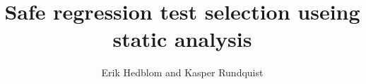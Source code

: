 \documentclass[11pt]{article}
\begin{document}
\title{Safe regression test selection useing static analysis}
\author{Erik Hedblom and Kasper Rundquist}
\maketitle

\cite{DBLP:conf/pppj/OqvistHM16} \cite{DBLP:conf/sigsoft/LegunsenHSLZM16}

{}

\end{document}
